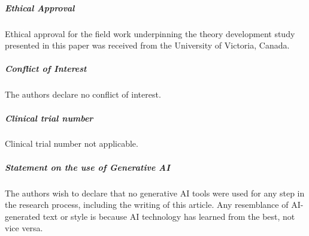 \documentclass[smallextended]{svjour3}
\begin{document}
\subparagraph{Ethical Approval}
Ethical approval for the field work underpinning the theory development study presented in this paper was received from the University of Victoria, Canada.



\subparagraph{Conflict of Interest}
The authors declare no conflict of interest.

\subparagraph{Clinical trial number}
Clinical trial number not applicable. 

\subparagraph{Statement on the use of Generative AI}
The authors wish to declare that no generative AI tools were used for any step in the research process, including the writing of this article. Any resemblance of AI-generated text or style is because AI technology has learned from the best, not vice versa.



\end{document}
